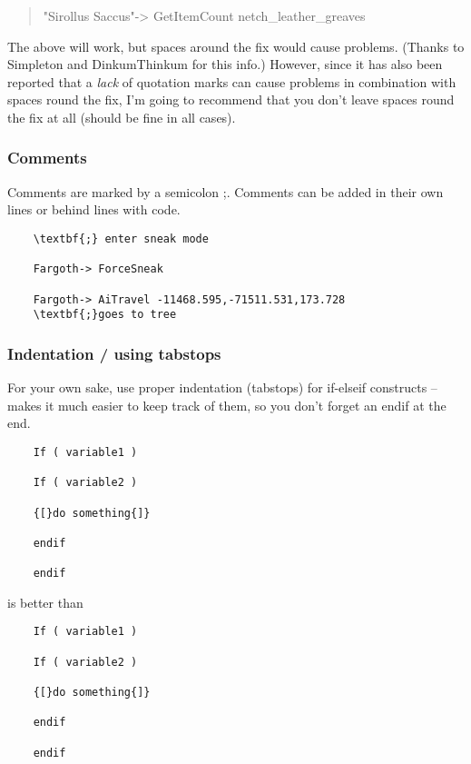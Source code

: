 \begin{quote}
"Sirollus Saccus"-> GetItemCount netch\_leather\_greaves
\end{quote}

The above will work, but spaces around the fix would cause problems.
(Thanks to Simpleton and DinkumThinkum for this info.) However, since it
has also been reported that a \emph{lack} of quotation marks can cause
problems in combination with spaces round the fix, I'm going to
recommend that you don't leave spaces round the fix at all (should be
fine in all cases).

\hypertarget{comments}{%
\subsubsection{Comments}\label{comments}}

Comments are marked by a semicolon ;. Comments can be added in their own
lines or behind lines with code.

\begin{lstlisting}
	\textbf{;} enter sneak mode
	
	Fargoth-> ForceSneak
	
	Fargoth-> AiTravel -11468.595,-71511.531,173.728
	\textbf{;}goes to tree
\end{lstlisting}

\hypertarget{indentation-using-tabstops}{%
\subsubsection{Indentation / using
tabstops}\label{indentation-using-tabstops}}

For your own sake, use proper indentation (tabstops) for if-elseif
constructs -- makes it much easier to keep track of them, so you don't
forget an endif at the end.


\begin{lstlisting}
	If ( variable1 )
	
	If ( variable2 )
	
	{[}do something{]}
	
	endif
	
	endif
\end{lstlisting}
	
is better than

\begin{lstlisting}
	If ( variable1 )
	
	If ( variable2 )
	
	{[}do something{]}
	
	endif
	
	endif
\end{lstlisting}

